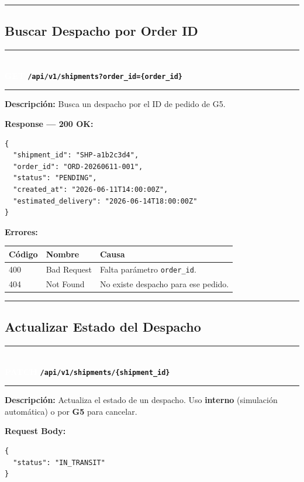 \documentclass[11pt, a4paper]{article}
\newcommand{\httpmethod}[2]{%
  \colorbox{#1}{\textcolor{white}{\textbf{\small\textsf{#2}}}}%
}
\newcommand{\routeheader}[3]{%
  \noindent\rule{\textwidth}{1.5pt}\\[0.3em]
  \httpmethod{#1}{#2}\;\texttt{\bfseries #3}\\[0.3em]
  \rule{\textwidth}{0.4pt}
  \vspace{0.3cm}
}
\begin{document}
\noindent\rule{\textwidth}{0.4pt}

\subsection{Buscar Despacho por Order ID}

\routeheader{get}{GET}{/api/v1/shipments?order\_id=\{order\_id\}}

\textbf{Descripción:} Busca un despacho por el ID de pedido de G5.

\vspace{0.3cm}
\textbf{Response --- 200 OK:}

\begin{lstlisting}
{
  "shipment_id": "SHP-a1b2c3d4",
  "order_id": "ORD-20260611-001",
  "status": "PENDING",
  "created_at": "2026-06-11T14:00:00Z",
  "estimated_delivery": "2026-06-14T18:00:00Z"
}
\end{lstlisting}

\textbf{Errores:}
\begin{table}[h!]
\small
\begin{tabularx}{\textwidth}{l l X}
  \toprule
  \textbf{Código} & \textbf{Nombre} & \textbf{Causa} \\
  \midrule
  400 & Bad Request & Falta parámetro \texttt{order\_id}. \\
  404 & Not Found   & No existe despacho para ese pedido. \\
  \bottomrule
\end{tabularx}
\end{table}

\noindent\rule{\textwidth}{0.4pt}

\subsection{Actualizar Estado del Despacho}

\routeheader{patch}{PATCH}{/api/v1/shipments/\{shipment\_id\}}

\textbf{Descripción:} Actualiza el estado de un despacho. Uso \textbf{interno}
(simulación automática) o por \textbf{G5} para cancelar.

\vspace{0.3cm}
\textbf{Request Body:}

\begin{lstlisting}
{
  "status": "IN_TRANSIT"
}
\end{lstlisting}
\end{document}
